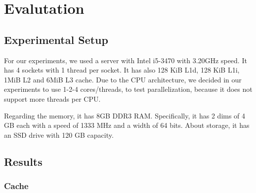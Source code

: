 \section{Evalutation}
\label{sec:experiments}

\subsection{Experimental Setup}
For our experiments, we used a server with Intel i5-3470 with 3.20GHz speed. It has 4 sockets with 1 thread per socket. 
It has also 128 KiB L1d, 128 KiB L1i, 1MiB L2 and 6MiB L3 cache. Due to the CPU architecture, we decided in our experiments to use 1-2-4 cores/threads, 
to test parallelization, because it does not support more threads per CPU.

Regarding the memory, it has 8GB DDR3 RAM. Specifically, it has 2 dims of 4 GB each with a speed of 1333 MHz and a width of 64 bits. 
About storage, it has an SSD drive with 120 GB capacity.




\subsection{Results}

\subsubsection{Cache}

